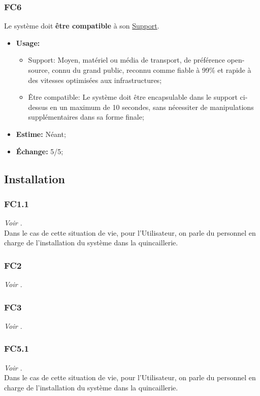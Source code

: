 \documentclass{article}
\begin{document}
\subsubsection{FC6}\label{cat:fc6}
Le système doit \textbf{être compatible} à son \uline{Support}.
\begin{itemize}
	\item \textbf{Usage:} \begin{itemize}
		\item Support: Moyen, matériel ou média de transport, de préférence
			  open-source, connu du grand public, reconnu comme fiable à 99\% et
			  rapide à des vitesses optimisées aux infrastructures;
		\item Être compatible: Le système doit être encapsulable dans le support
			  ci-dessus en un maximum de 10 secondes, sans nécessiter de
			  manipulations supplémentaires dans sa forme finale;
	\end{itemize}
	\item \textbf{Estime:} Néant;
	\item \textbf{Échange:} 5/5;
\end{itemize}

\newpage
\subsection{Installation}

\subsubsection{FC1.1}
\textit{Voir \hyperref[cat:fc1]{}}.
\medskip\\
Dans le cas de cette situation de vie, pour l'Utilisateur, on parle du personnel
en charge de l'installation du système dans la quincaillerie.

\subsubsection{FC2}
\textit{Voir \hyperref[cat:fc2]{}}.

\subsubsection{FC3}
\textit{Voir \hyperref[cat:fc3]{}}.

\subsubsection{FC5.1}
\textit{Voir \hyperref[cat:fc5]{}}.
\medskip\\
Dans le cas de cette situation de vie, pour l'Utilisateur, on parle du personnel
en charge de l'installation du système dans la quincaillerie.
\end{document}
